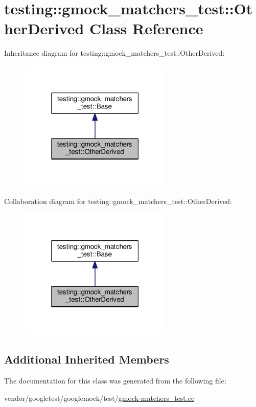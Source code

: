 \hypertarget{classtesting_1_1gmock__matchers__test_1_1OtherDerived}{}\section{testing\+:\+:gmock\+\_\+matchers\+\_\+test\+:\+:Other\+Derived Class Reference}
\label{classtesting_1_1gmock__matchers__test_1_1OtherDerived}


Inheritance diagram for testing\+:\+:gmock\+\_\+matchers\+\_\+test\+:\+:Other\+Derived\+:\nopagebreak
\begin{figure}[H]
\begin{center}
\leavevmode
\includegraphics[width=207pt]{classtesting_1_1gmock__matchers__test_1_1OtherDerived__inherit__graph}
\end{center}
\end{figure}


Collaboration diagram for testing\+:\+:gmock\+\_\+matchers\+\_\+test\+:\+:Other\+Derived\+:\nopagebreak
\begin{figure}[H]
\begin{center}
\leavevmode
\includegraphics[width=207pt]{classtesting_1_1gmock__matchers__test_1_1OtherDerived__coll__graph}
\end{center}
\end{figure}
\subsection*{Additional Inherited Members}


The documentation for this class was generated from the following file\+:\begin{DoxyCompactItemize}
\item 
vendor/googletest/googlemock/test/\hyperlink{gmock-matchers__test_8cc}{gmock-\/matchers\+\_\+test.\+cc}\end{DoxyCompactItemize}
